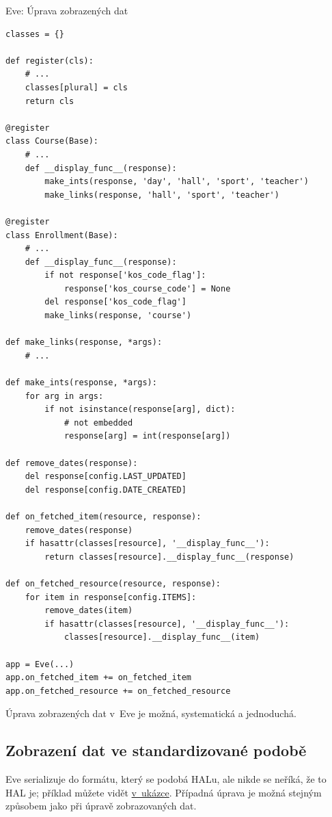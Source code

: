 \begin{listing}[htbp]
\caption{{\label{code:eve:modify}Eve: Úprava zobrazených dat}}
\begin{verbatim}
classes = {}

def register(cls):
    # ...
    classes[plural] = cls
    return cls

@register
class Course(Base):
    # ...
    def __display_func__(response):
        make_ints(response, 'day', 'hall', 'sport', 'teacher')
        make_links(response, 'hall', 'sport', 'teacher')

@register
class Enrollment(Base):
    # ...
    def __display_func__(response):
        if not response['kos_code_flag']:
            response['kos_course_code'] = None
        del response['kos_code_flag']
        make_links(response, 'course')

def make_links(response, *args):
    # ...

def make_ints(response, *args):
    for arg in args:
        if not isinstance(response[arg], dict):
            # not embedded
            response[arg] = int(response[arg])

def remove_dates(response):
    del response[config.LAST_UPDATED]
    del response[config.DATE_CREATED]

def on_fetched_item(resource, response):
    remove_dates(response)
    if hasattr(classes[resource], '__display_func__'):
        return classes[resource].__display_func__(response)

def on_fetched_resource(resource, response):
    for item in response[config.ITEMS]:
        remove_dates(item)
        if hasattr(classes[resource], '__display_func__'):
            classes[resource].__display_func__(item)

app = Eve(...)
app.on_fetched_item += on_fetched_item
app.on_fetched_resource += on_fetched_resource
\end{verbatim}
\end{listing}

Úprava zobrazených dat v~Eve je možná, systematická a jednoduchá.

\subsection{Zobrazení dat ve standardizované podobě}\label{zobrazenuxed-dat-ve-standardizovanuxe9-podobux11b}

Eve serializuje do formátu, který se podobá HALu, ale nikde se neříká, že to HAL je; příklad můžete vidět \protect\hyperlink{code:eve:out}{v~ukázce}. Případná úprava je možná stejným způsobem jako při úpravě zobrazovaných dat.

